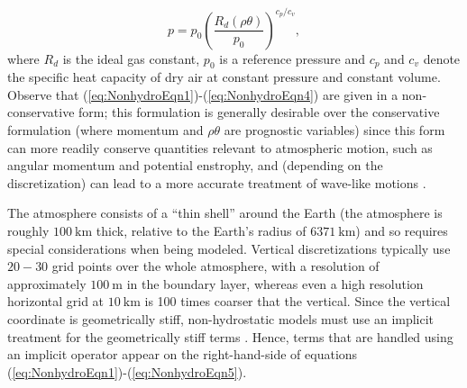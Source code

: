 \documentclass[11pt]{article}
\begin{document}
\begin{equation*}
p = p_0 \left( \frac{R_d (\rho \theta)}{p_0} \right)^{c_p / c_v},
\end{equation*} where $R_d$ is the ideal gas constant, $p_0$ is a reference pressure and $c_p$ and $c_v$ denote the specific heat capacity of dry air at constant pressure and constant volume.  Observe that (\ref{eq:NonhydroEqn1})-(\ref{eq:NonhydroEqn4}) are given in a non-conservative form; this formulation is generally desirable over the conservative formulation (where momentum and $\rho \theta$ are prognostic variables) since this form can more readily conserve quantities relevant to atmospheric motion, such as angular momentum and potential enstrophy, and (depending on the discretization) can lead to a more accurate treatment of wave-like motions \citep{JTTJW2005JCP}.

The atmosphere consists of a ``thin shell'' around the Earth (the atmosphere is roughly $100\ \mbox{km}$ thick, relative to the Earth's radius of $6371\ \mbox{km}$) and so requires special considerations when being modeled.  Vertical discretizations typically use $20-30$ grid points over the whole atmosphere, with a resolution of approximately $100\ \mbox{m}$ in the boundary layer, whereas even a high resolution horizontal grid at $10\ \mbox{km}$ is 100 times coarser that the vertical.  Since the vertical coordinate is geometrically stiff, non-hydrostatic models must use an implicit treatment for the geometrically stiff terms \citep{PAUCJ2012MWR}.  Hence, terms that are handled using an implicit operator appear on the right-hand-side of equations (\ref{eq:NonhydroEqn1})-(\ref{eq:NonhydroEqn5}).
\end{document}
